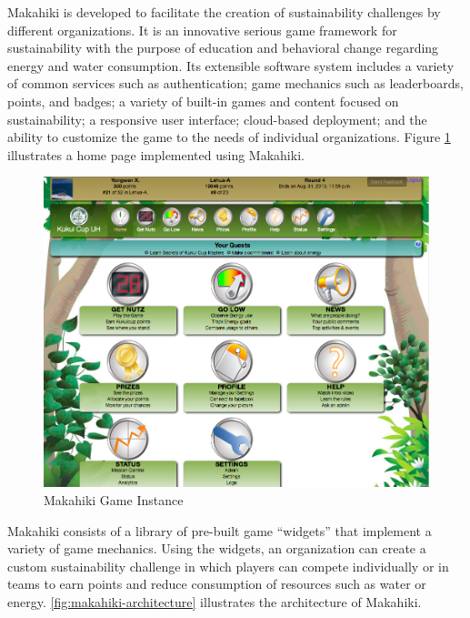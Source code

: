 \documentclass{sigchi}
\begin{document}
Makahiki \cite{csdl2-12-06} is developed to facilitate the creation of sustainability challenges by
different organizations. It is an innovative serious game framework for sustainability with
the purpose of education and behavioral change regarding energy and water consumption.
Its extensible software system includes a variety of common services such as authentication; game mechanics such as leaderboards, points, and badges; a variety of built-in games and
content focused on sustainability; a responsive user interface; cloud-based deployment;
and the ability to customize the game to the needs of individual organizations.
Figure \ref{fig:Makahiki-Home-Page} illustrates a home page implemented using Makahiki.

\begin{figure}[ht!]
  \center
  \includegraphics[width=\columnwidth]{kukuicup-home}
  \caption{Makahiki Game Instance}
  \label{fig:Makahiki-Home-Page}
\end{figure}

Makahiki consists of a library of
pre-built game ``widgets'' that implement a variety of game mechanics.
Using the widgets, an organization can create a custom sustainability
challenge in which players can compete individually or in teams to
earn points and reduce consumption of resources such as water or energy.
\autoref{fig:makahiki-architecture} illustrates the architecture of
Makahiki.
\end{document}
